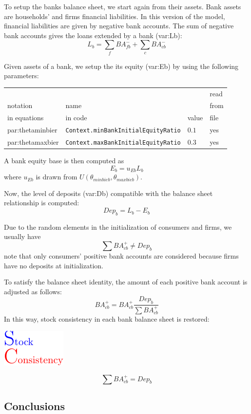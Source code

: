 \documentclass{book}
\begin{document}
To setup the banks balance sheet, we start again from their assets. Bank assets are households' and firms financial liabilities. In this version of the model, financial liabilities are given by negative bank accounts. 
The sum of negative bank accounts gives the loans extended by a bank (\gls{var:Lb}):
\[
	L_b=\sum_f BA_{fb}^- + \sum_c BA_{cb}^-
\]



Given assets of a bank, we setup the its equity (\gls{var:Eb}) by using the following\\
parameters:\\
\begin{tabular}{l l l l}
	\hline
	& &&read\\
	notation& name &&from\\
	in equations& in code&value&file\\
	\hline
	\hline
 \gls{par:thetaminbier}&\verb+Context.minBankInitialEquityRatio+&$0.1$&yes\\
 \gls{par:thetamaxbier}&\verb+Context.maxBankInitialEquityRatio+&$0.3$&yes\\
	\hline
\end{tabular}

\vskip5mm
A bank equity base is then computed as
\[
	E_b=u_{Eb}L_b
\]
where $u_{Eb}$ is drawn from $U(\theta_{minbieb},\theta_{maxbieb})$.

Now, the level of deposits (\gls{var:Db}) compatible with the balance sheet relationship is computed:
\[
Dep_b=L_b-E_b
\]

Due to the random elements in the initialization of consumers and firms, we usually have
\[
	\sum BA^+_{cb} \neq Dep_b
\]
note that only consumers' positive bank accounts are considered because firms have no deposits at initialization.

To satisfy the balance sheet identity, the amount of each positive bank account is adjusted as follows:
\[
	BA^{+}_{cb}=BA^+_{cb}\frac{Dep_b}{\sum BA^+_{cb}}
\]
In this way, stock consistency in each bank balance sheet is restored:\begin{marginfigure}
	\hskip1cm\includegraphics[scale=1.0]{sc_logo-0.pdf}
\end{marginfigure}

\[
	\sum BA^{+}_{cb}=Dep_b
\]
\subsection{Conclusions}
\end{document}
